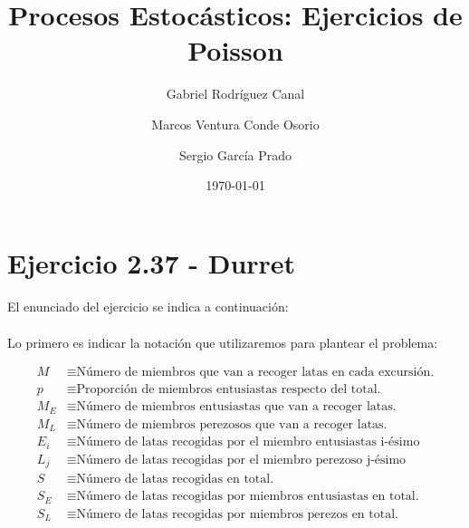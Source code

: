 \documentclass[a4paper, spanish]{article}
\title{Procesos Estocásticos: Ejercicios de Poisson}
\author{
  Gabriel Rodríguez Canal \and
  Marcos Ventura Conde Osorio \and
  Sergio García Prado
}
\date{\today}
\begin{document}
  \maketitle

  \section{Ejercicio 2.37 - Durret}

    \paragraph{}
    El enunciado del ejercicio se indica a continuación:

    \begin{displayquote}
    \end{displayquote}

    \paragraph{}
    Lo primero es indicar la notación que utilizaremos para plantear el problema:

    \begin{align*}
      M &\equiv \text{Número de miembros que van a recoger latas en cada excursión.} \\
      p &\equiv \text{Proporción de miembros entusiastas respecto del total.} \\
      M_E &\equiv \text{Número de miembros entusiastas que van a recoger latas.} \\
      M_L &\equiv \text{Número de miembros perezosos que van a recoger latas.} \\
      E_i &\equiv \text{Número de latas recogidas por el miembro entusiastas i-ésimo} \\
      L_j &\equiv \text{Número de latas recogidas por el miembro perezoso j-ésimo} \\
      S &\equiv \text{Número de latas recogidas en total.} \\
      S_E &\equiv \text{Número de latas recogidas por miembros entusiastas en total.} \\
      S_L &\equiv \text{Número de latas recogidas por miembros perezos en total.}
    \end{align*}
\end{document}
